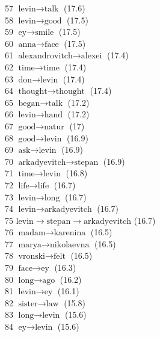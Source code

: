 \begin{appendices}
    57  $ \text{levin} \to \text{talk} $ (17.6) \\
    58  $ \text{levin} \to \text{good} $ (17.5) \\
    59  $ \text{ey} \to \text{smile} $ (17.5) \\
    60  $ \text{anna} \to \text{face} $ (17.5) \\
    61  $ \text{alexandrovitch} \to \text{alexei} $ (17.4) \\
    62  $ \text{time} \to \text{time} $ (17.4) \\
    63  $ \text{don} \to \text{levin} $ (17.4) \\
    64  $ \text{thought} \to \text{thought} $ (17.4) \\
    65  $ \text{began} \to \text{talk} $ (17.2) \\
    66  $ \text{levin} \to \text{hand} $ (17.2) \\
    67  $ \text{good} \to \text{natur} $ (17) \\
    68  $ \text{good} \to \text{levin} $ (16.9) \\
    69  $ \text{ask} \to \text{levin} $ (16.9) \\
    70  $ \text{arkadyevitch} \to \text{stepan} $ (16.9) \\
    71  $ \text{time} \to \text{levin} $ (16.8) \\
    72  $ \text{life} \to \text{life} $ (16.7) \\
    73  $ \text{levin} \to \text{long} $ (16.7) \\
    74  $ \text{levin} \to \text{arkadyevitch} $ (16.7) \\
    75  $ \text{levin} \to \text{stepan} \to \text{arkadyevitch} $ (16.7) \\
    76  $ \text{madam} \to \text{karenina} $ (16.5) \\
    77  $ \text{marya} \to \text{nikolaevna} $ (16.5) \\
    78  $ \text{vronski} \to \text{felt} $ (16.5) \\
    79  $ \text{face} \to \text{ey} $ (16.3) \\
    80  $ \text{long} \to \text{ago} $ (16.2) \\
    81  $ \text{levin} \to \text{ey} $ (16.1) \\
    82  $ \text{sister} \to \text{law} $ (15.8) \\
    83  $ \text{long} \to \text{levin} $ (15.6) \\
    84  $ \text{ey} \to \text{levin} $ (15.6) \\

\end{appendices}
